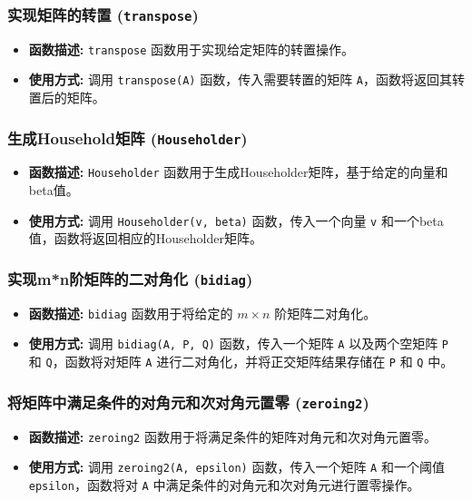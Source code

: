 \documentclass{article}
\begin{document}
\subsubsection*{实现矩阵的转置 (\texttt{transpose})}
\begin{itemize}
	\item \textbf{函数描述:} \texttt{transpose} 函数用于实现给定矩阵的转置操作。
	\item \textbf{使用方式:} 调用 \texttt{transpose(A)} 函数，传入需要转置的矩阵 \texttt{A}，函数将返回其转置后的矩阵。
\end{itemize}

\subsubsection*{生成Household矩阵 (\texttt{Householder})}
\begin{itemize}
	\item \textbf{函数描述:} \texttt{Householder} 函数用于生成Householder矩阵，基于给定的向量和beta值。
	\item \textbf{使用方式:} 调用 \texttt{Householder(v, beta)} 函数，传入一个向量 \texttt{v} 和一个beta值，函数将返回相应的Householder矩阵。
\end{itemize}

\subsubsection*{实现m*n阶矩阵的二对角化 (\texttt{bidiag})}
\begin{itemize}
	\item \textbf{函数描述:} \texttt{bidiag} 函数用于将给定的 $m \times n$ 阶矩阵二对角化。
	\item \textbf{使用方式:} 调用 \texttt{bidiag(A, P, Q)} 函数，传入一个矩阵 \texttt{A} 以及两个空矩阵 \texttt{P} 和 \texttt{Q}，函数将对矩阵 \texttt{A} 进行二对角化，并将正交矩阵结果存储在 \texttt{P} 和 \texttt{Q} 中。
\end{itemize}

\subsubsection*{将矩阵中满足条件的对角元和次对角元置零 (\texttt{zeroing2})}
\begin{itemize}
	\item \textbf{函数描述:} \texttt{zeroing2} 函数用于将满足条件的矩阵对角元和次对角元置零。
	\item \textbf{使用方式:} 调用 \texttt{zeroing2(A, epsilon)} 函数，传入一个矩阵 \texttt{A} 和一个阈值 \texttt{epsilon}，函数将对 \texttt{A} 中满足条件的对角元和次对角元进行置零操作。
\end{itemize}
\end{document}
